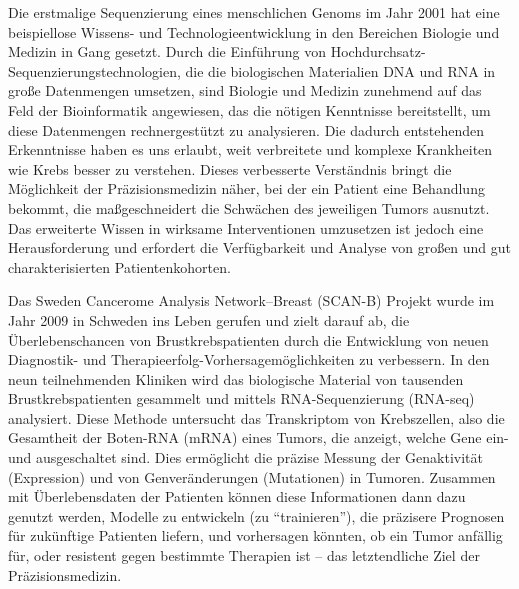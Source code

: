 \documentclass[11pt]{book}
\begin{document}
Die erstmalige Sequenzierung eines menschlichen Genoms im Jahr 2001 hat eine beispiellose Wissens- und Technologieentwicklung in den Bereichen Biologie und Medizin in Gang gesetzt. Durch die Einführung von Hochdurchsatz-Sequenzierungstechnologien, die die biologischen Materialien DNA und RNA in große Datenmengen umsetzen, sind Biologie und Medizin zunehmend auf das Feld der Bioinformatik angewiesen, das die nötigen Kenntnisse bereitstellt, um diese Datenmengen rechnergestützt zu analysieren. Die dadurch entstehenden Erkenntnisse haben es uns erlaubt, weit verbreitete und komplexe Krankheiten wie Krebs besser zu verstehen. Dieses verbesserte Verständnis bringt die Möglichkeit der Präzisionsmedizin näher, bei der ein Patient eine Behandlung bekommt, die maßgeschneidert die Schwächen des jeweiligen Tumors ausnutzt. Das erweiterte Wissen in wirksame Interventionen umzusetzen ist jedoch eine Herausforderung und erfordert die Verfügbarkeit und Analyse von großen und gut charakterisierten Patientenkohorten.

Das Sweden Cancerome Analysis Network--Breast (SCAN-B) Projekt wurde im Jahr 2009 in Schweden ins Leben gerufen und zielt darauf ab, die Überlebenschancen von Brustkrebspatienten durch die Entwicklung von neuen Diagnostik- und Therapieerfolg-Vorhersage\-möglichkeiten zu verbessern. In den neun teilnehmenden Kliniken wird das biologische Material von tausenden Brustkrebspatienten gesammelt und mittels RNA-Sequenzierung (RNA-seq) analysiert. Diese Methode untersucht das Transkriptom von Krebszellen, also die Gesamtheit der Boten-RNA (mRNA) eines Tumors, die anzeigt, welche Gene ein- und ausgeschaltet sind. Dies ermöglicht die präzise Messung der Genaktivität (Expression) und von Genveränderungen (Mutationen) in Tumoren. Zusammen mit Überlebensdaten der Patienten können diese Informationen dann dazu genutzt werden, Modelle zu entwickeln (zu ``trainieren''), die präzisere Prognosen für zukünftige Patienten liefern, und vorhersagen könnten, ob ein Tumor anfällig für, oder resistent gegen bestimmte Therapien ist -- das letztendliche Ziel der Präzisionsmedizin.
\end{document}
